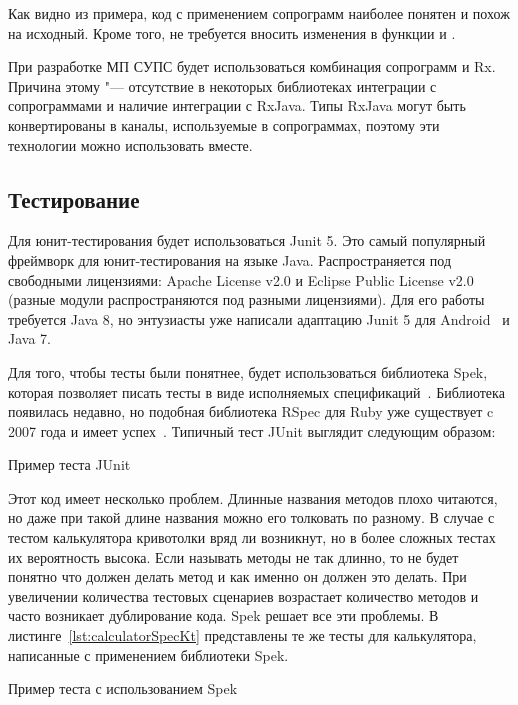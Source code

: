 Как видно из примера, код с применением сопрограмм наиболее понятен и похож на исходный.
Кроме того, не требуется вносить изменения в функции  и .

При разработке МП СУПС будет использоваться комбинация сопрограмм и Rx.
Причина этому "--- отсутствие в некоторых библиотеках интеграции с сопрограммами и наличие интеграции с RxJava.
Типы RxJava могут быть конвертированы в каналы, используемые в сопрограммах, поэтому эти технологии можно использовать вместе.

\subsection{Тестирование}
\label{subsec:testing}
Для юнит-тестирования будет использоваться Junit 5.
Это самый популярный фреймворк для юнит-тестирования на языке Java.
Распространяется под свободными лицензиями: Apache License v2.0 и Eclipse Public License v2.0 (разные модули распространяются под разными лицензиями).
Для его работы требуется Java 8, но энтузиасты уже написали адаптацию Junit 5 для Android~\cite{gihub:junit5Android} и Java 7.

Для того, чтобы тесты были понятнее, будет использоваться библиотека Spek, которая позволяет писать тесты в виде исполняемых спецификаций~\cite{spek:docs}.
Библиотека появилась недавно, но подобная библиотека RSpec для Ruby уже существует c 2007 года и имеет успех~\cite{rspec:about}.
Типичный тест JUnit выглядит следующим образом:

\begin{listing}[H]
  \caption{Пример теста JUnit}
  \label{lst:calculatorTestKt}
\end{listing}

Этот код имеет несколько проблем.
Длинные названия методов плохо читаются, но даже при такой длине названия можно его толковать по разному.
В случае с тестом калькулятора кривотолки вряд ли возникнут, но в более сложных тестах их вероятность высока.
Если называть методы не так длинно, то не будет понятно что должен делать метод и как именно он должен это делать.
При увеличении количества тестовых сценариев возрастает количество методов и часто возникает дублирование кода.
Spek решает все эти проблемы.
В листинге~\ref{lst:calculatorSpecKt} представлены те же тесты для калькулятора, написанные с применением библиотеки Spek.

\begin{listing}[H]
  \caption{Пример теста с использованием Spek}
  \label{lst:calculatorSpecKt}
\end{listing}

